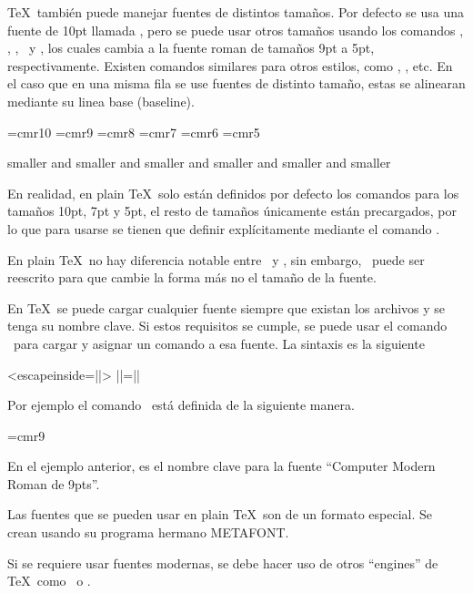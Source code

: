 \TeX\ también puede manejar fuentes de distintos tamaños. Por defecto se usa una fuente de 10pt llamada \texcs\tenrm, pero se puede usar otros tamaños usando los comandos \texcs\ninerm, \texcs\eightrm, \texcs\sevenrm, \texcs\sixrm\ y \texcs\fiverm, los cuales cambia a la fuente roman de tamaños 9pt a 5pt, respectivamente. Existen comandos similares para otros estilos, como \texcs\tensl, \texcs\ninesl, etc. En el caso que en una misma fila se use fuentes de distinto tamaño, estas se alinearan mediante su linea base (baseline).

{
\font\tenrm=cmr10  \font\ninerm=cmr9  \font\eightrm=cmr8
\font\sevenrm=cmr7  \font\sixrm=cmr6  \font\fiverm=cmr5
\begin{texexample}
  \tenrm smaller \ninerm and smaller
  \eightrm and smaller \sevenrm and smaller
  \sixrm and smaller \fiverm and smaller
\end{texexample}
}

\begin{notebox}
  En realidad, en plain \TeX\ solo están definidos por defecto los comandos para los tamaños 10pt, 7pt y 5pt, el resto de tamaños únicamente están precargados, por lo que para usarse se tienen que definir explícitamente mediante el comando \texcs\font.
\end{notebox}


En plain \TeX\ no hay diferencia notable entre \texcs\rm\ y \texcs\tenrm, sin embargo, \texcs\rm\ puede ser reescrito para que cambie la forma más no el tamaño de la fuente.

En \TeX\ se puede cargar cualquier fuente siempre que existan los archivos y se tenga su nombre clave. Si estos requisitos se cumple, se puede usar el comando \texcs\font\ para cargar y asignar un comando a esa fuente. La sintaxis es la siguiente

\begin{texcode}<escapeinside=||>
  \font||=||
\end{texcode}

Por ejemplo el comando \texcs\ninerm\ está definida de la siguiente manera.
\begin{texcode}
  \font\ninerm=cmr9
\end{texcode}

En el ejemplo anterior,  es el nombre clave para la fuente ``Computer Modern Roman de 9pts''.

\begin{notebox}
  Las fuentes que se pueden usar en plain \TeX\ son de un formato especial. Se crean usando su programa hermano METAFONT.

  Si se requiere usar fuentes modernas, se debe hacer uso de otros ``engines'' de \TeX\ como \XeTeX\ o \LuaTeX.
\end{notebox}

